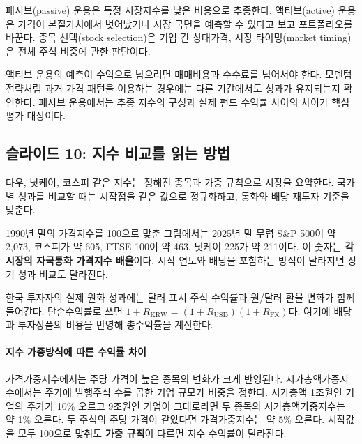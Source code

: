 \documentclass[11pt,a4paper]{article}
\begin{document}
패시브(passive) 운용은 특정 시장지수를 낮은 비용으로 추종한다. 액티브(active) 운용은 가격이 본질가치에서 벗어났거나 시장 국면을 예측할 수 있다고 보고 포트폴리오를 바꾼다. 종목 선택(stock selection)은 기업 간 상대가격, 시장 타이밍(market timing)은 전체 주식 비중에 관한 판단이다.
\par

액티브 운용의 예측이 수익으로 남으려면 매매비용과 수수료를 넘어서야 한다. 모멘텀 전략처럼 과거 가격 패턴을 이용하는 경우에는 다른 기간에서도 성과가 유지되는지 확인한다. 패시브 운용에서는 추종 지수의 구성과 실제 펀드 수익률 사이의 차이가 핵심 평가 대상이다.
\par

\subsection{슬라이드 10: 지수 비교를 읽는 방법}

다우, 닛케이, 코스피 같은 지수는 정해진 종목과 가중 규칙으로 시장을 요약한다. 국가별 성과를 비교할 때는 시작점을 같은 값으로 정규화하고, 통화와 배당 재투자 기준을 맞춘다.
\par

1990년 말의 가격지수를 100으로 맞춘 그림에서는 2025년 말 무렵 S\&P 500이 약 2,073, 코스피가 약 605, FTSE 100이 약 463, 닛케이 225가 약 211이다. 이 숫자는 \textbf{각 시장의 자국통화 가격지수 배율}이다. 시작 연도와 배당을 포함하는 방식이 달라지면 장기 성과 비교도 달라진다.
\par

한국 투자자의 실제 원화 성과에는 달러 표시 주식 수익률과 원/달러 환율 변화가 함께 들어간다. 단순수익률로 쓰면 $1+R_{\mathrm{KRW}}=(1+R_{\mathrm{USD}})(1+R_{\mathrm{FX}})$다. 여기에 배당과 투자상품의 비용을 반영해 총수익률을 계산한다.
\par

\paragraph{지수 가중방식에 따른 수익률 차이}

가격가중지수에서는 주당 가격이 높은 종목의 변화가 크게 반영된다. 시가총액가중지수에서는 주가에 발행주식 수를 곱한 기업 규모가 비중을 정한다. 시가총액 1조원인 기업의 주가가 10\% 오르고 9조원인 기업이 그대로라면 두 종목의 시가총액가중지수는 약 1\% 오른다. 두 주식의 주당 가격이 같았다면 가격가중지수는 약 5\% 오른다. 시작값을 모두 100으로 맞춰도 \textbf{가중 규칙}이 다르면 지수 수익률이 달라진다.
\par
\end{document}
